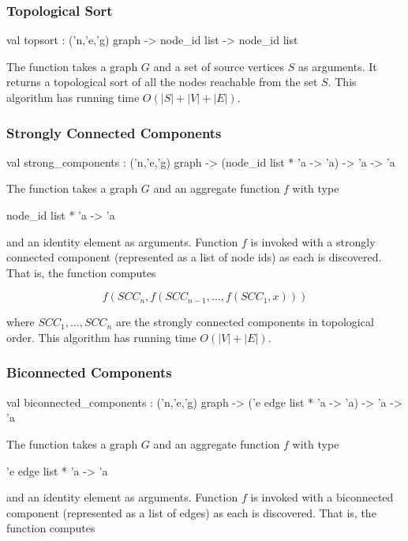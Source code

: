 \subsubsection{Topological Sort}
\begin{SML}
  val topsort : ('n,'e,'g) graph -> node_id list -> node_id list
\end{SML}
   The function 
 takes a graph $G$ and a set of source vertices $S$
as arguments.  It returns a topological sort of all the nodes reachable from
the set $S$.  
This algorithm has running time $O(|S|+|V|+|E|)$.

\subsubsection{Strongly Connected Components}
\begin{SML}
 val strong_components : ('n,'e,'g) graph -> 
   (node_id list * 'a -> 'a) -> 'a -> 'a
\end{SML}
   The function  takes a graph $G$ and
an aggregate function $f$ with type 
\begin{SML}
  node_id list * 'a -> 'a
\end{SML}
\noindent and an identity element  as arguments.  
Function $f$ is invoked with a strongly connected component 
(represented as a list of node ids) as each is discovered.   
That is, the function  computes 

\[ 
   f(SCC_n,f(SCC_{n-1},\ldots, f(SCC_1,x)))
\] 

where $SCC_1,\ldots,SCC_n$ are the strongly connected components
in topological order.  This algorithm has running time $O(|V|+|E|)$.

\subsubsection{Biconnected Components}
\begin{SML}
 val biconnected_components : ('n,'e,'g) graph -> 
        ('e edge list * 'a -> 'a) -> 'a -> 'a
\end{SML}
   The function  takes a graph $G$ and
an aggregate function $f$ with type 
\begin{SML}
  'e edge list * 'a -> 'a
\end{SML}
\noindent and an identity element  as arguments.  
Function $f$ is invoked with a biconnected component 
(represented as a list of edges) as each is discovered.
That is, the function  computes 

